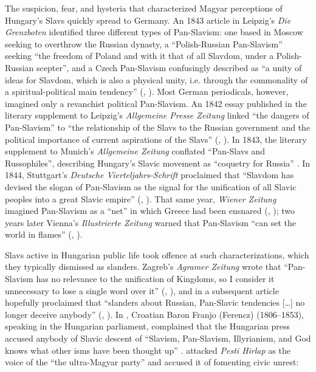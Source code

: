 The suspicion, fear, and hysteria that characterized Magyar perceptions of Hungary’s Slavs quickly spread to Germany. An 1843 article in Leipzig’s \textit{Die Grenzboten} identified three different types of Pan-Slavism: one based in Moscow seeking to overthrow the Russian dynasty, a “Polish-Russian Pan-Slavism” seeking “the freedom of Poland and with it that of all Slavdom, under a Polish-Russian scepter”, and a Czech Pan-Slavism confusingly described as “a unity of ideas for Slavdom, which is also a physical unity, i.e. through the commonality of a spiri\-tual-political main tendency” (, \cite[1486--1487]{anon_slawischen_1843}). Most German periodicals, however, imagined only a revanchist political Pan-Slavism. An 1842 essay published in the literary supplement to Leipzig’s \textit{Allgemeine Presse Zeitung} linked “the dangers of Pan-Slavism” to “the relationship of the Slavs to the Russian government and the political importance of current aspirations of the Slavs” (, \cite[931]{anon_literatur_1842}). In 1843, the literary supplement to Munich’s \textit{Allgemeine Zeitung} conflated “Pan-Slavs and Russophiles”, describing Hungary’s Slavic movement as “coquetry for Russia” \citep[1089]{lukacs_sprachenkampf_1843}. In 1844, Stuttgart’s \textit{Deutsche Vierteljahrs-Schrift} proclaimed that “Slavdom has devised the slogan of Pan-Slavism as the signal for the unification of all Slavic peoples into a great Slavic empire” (, \cite[121]{anon_stellung_1844}). That same year, \textit{Wiener Zeitung} imagined Pan-Slavism as a “net” in which Greece had been ensnared (, \cite[227]{anon_griechenland_1844}); two years later Vienna’s \textit{Illustrierte Zeitung} warned that Pan-Slavism “can set the world in flames” (, \cite[186]{anon_ueber_1846}).

Slavs active in Hungarian public life took offence at such characterizations, which they typically dismissed as slanders. Zagreb’s \textit{Agramer Zeitung} wrote that “Pan-Slavism has no relevance to the unification of Kingdoms, so I consider it unnecessary to lose a single word over it” (, \cite[368]{anon_vortag_1844}), and in a subsequent article hopefully proclaimed that “slanders about Russian, Pan-Slavic tendencies […] no longer deceive anybody” (, \cite[471]{anon_kroatien_1845}). In \citeyear{kulmer_speech_1843}, Croatian Baron Fran\-jo (Ferencz) \citeauthor{kulmer_speech_1843} (1806--1853), speaking in the Hungarian parliament, complained that the Hungarian press accused anybody of Slavic descent of “Slavism, Pan-Slavism, Illyrianism, and God knows what other isms have been thought up” \citep[163]{kulmer_speech_1843}. \citet[40]{hoitsy_apologie_1843} attacked \textit{Pesti Hirlap} as the voice of the “the ultra-Magyar party” and accused it of fomenting civic unrest:

